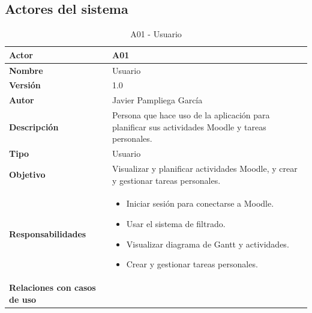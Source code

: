 \subsection{Actores del sistema}
\begin{table}[H]
	\centering
	\begin{tabularx}{\linewidth}{ p{} p{} }
		\toprule
		\textbf{Actor}    & \textbf{A01}\\
		\toprule
            \textbf{Nombre}              & Usuario    \\
		\textbf{Versión}              & 1.0    \\
		\textbf{Autor}                & Javier Pampliega García \\
		\textbf{Descripción}          & Persona que hace uso de la aplicación para planificar sus actividades Moodle y tareas personales. \\
		\textbf{Tipo}         & Usuario \\
            \textbf{Objetivo}         & Visualizar y planificar actividades Moodle, y crear y gestionar tareas personales.\\
		\textbf{Responsabilidades}             &
		\begin{itemize}
			\def\labelenumi{\arabic{enumi}.}
			\tightlist
                \item Iniciar sesión para conectarse a Moodle.
			\item Usar el sistema de filtrado.
			\item Visualizar diagrama de Gantt y actividades.
                \item Crear y gestionar tareas personales.
		\end{itemize}\\
		\textbf{Relaciones con casos de uso}        &  \\
		\bottomrule
	\end{tabularx}
	\caption{A01 - Usuario}
\end{table}

